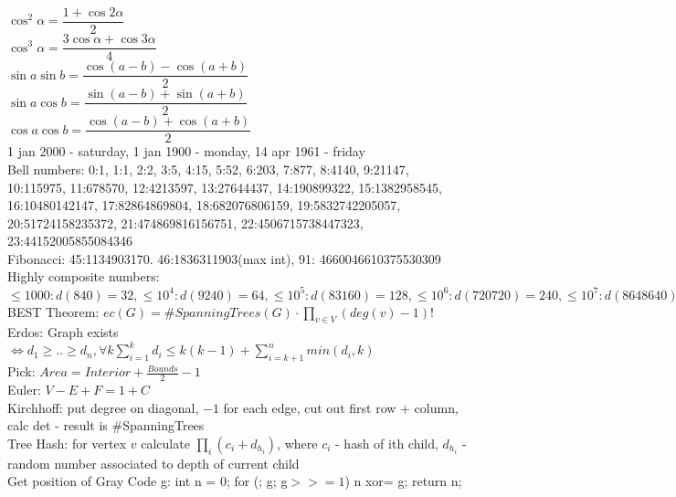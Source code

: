 $\cos^2 \alpha  = \dfrac{1+\cos 2\alpha}{2}$\\
$\cos^3 \alpha  = \dfrac{3\cos\alpha +\cos 3\alpha }{4}$\\
$\sin a \sin b = \dfrac{\cos(a-b) - \cos(a+b)}{2}$\\
$\sin a \cos b = \dfrac{\sin(a-b) + \sin(a+b)}{2}$\\
$\cos a \cos b = \dfrac{\cos(a-b) + \cos(a+b)}{2}$\\
1 jan 2000 - saturday, 1 jan 1900 - monday, 14 apr 1961 - friday\\
Bell numbers: 0:1, 1:1, 2:2, 3:5, 4:15, 5:52, 6:203, 7:877, 8:4140, 9:21147, 10:115975, 11:678570, 12:4213597,
13:27644437, 14:190899322, 15:1382958545, 16:10480142147, 17:82864869804, 18:682076806159, 19:5832742205057,
20:51724158235372, 21:474869816156751, 22:4506715738447323, 23:44152005855084346\\
Fibonacci: 45:1134903170. 46:1836311903(max int), 91: 4660046610375530309\\
Highly composite numbers:\\
$\leq 1000 : d(840) = 32, \leq 10^4 : d(9240) = 64, \leq 10^5 : d(83160) = 128, \leq 10^6 : d(720720) = 240, \leq 10^7 : d(8648640) = 448, \leq 10^8 : d(91 891 800) = 768, \leq 10^9 : d(931170240) = 1344, \leq 10^{11} : d(97 772 875 200) = 4032, \leq 10^{15}: d(866 421 317 361 600) = 26880, \leq 10^{18} : d(897 612 484 786 617 600) = 103680$\\
BEST Theorem: $ec(G) = \#SpanningTrees(G) \cdot \prod\limits_{v\in V} (deg(v) - 1)!$\\
Erdos: Graph exists $\Leftrightarrow  d_1 \geq .. \geq d_n, \forall k \sum\limits_{i=1}^{k}d_i \leq k(k-1) + \sum\limits_{i=k+1}^{n}min(d_i,k)$\\
Pick: $Area = Interior + \frac{Bounds}{2} - 1$\\
Euler: $V - E + F = 1 + C$\\
Kirchhoff: put degree on diagonal, $-1$ for each edge, cut out first row + column, calc det - result is \#SpanningTrees\\
Tree Hash: for vertex $v$ calculate $\prod\limits_{i} (c_i + d_{h_i})$, where $c_i$ - hash of ith child, $d_{h_i}$ - random number associated to depth of current child\\
Get position of Gray Code g: int n = 0; for (; g; g$>>=1$) n xor= g; return n;\\